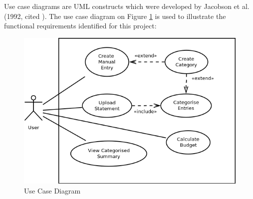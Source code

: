 Use case diagrams are UML constructs which were developed by Jacobson et al.
(1992, cited \cite[][p.~154]{bennett2010object}). The use case diagram on
Figure \ref{fig:UseCaseDiagram} is used to illustrate the functional
requirements identified for this project:
\begin{figure}[ht!]
  \begin{center}
    \includegraphics[width=14cm]{./contents/img/Use_Case_Diagram.png}
  \end{center}
  \caption{Use Case Diagram}
  \label{fig:UseCaseDiagram}
\end{figure}
\FloatBarrier

